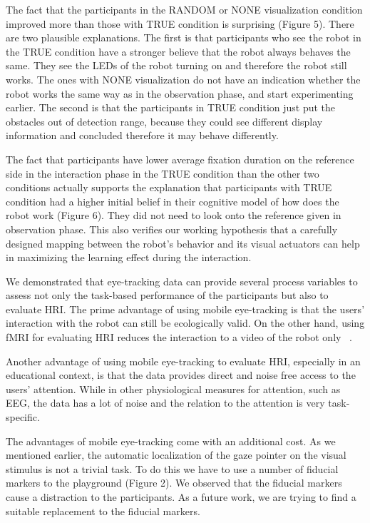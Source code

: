 \documentclass{sig-alternate}
\begin{document}
The fact that the participants in the RANDOM or NONE visualization
condition improved more than those with TRUE condition is surprising
(Figure 5). There are two plausible explanations. The first is that
participants who see the robot in the TRUE condition have a stronger
believe that the robot always behaves the same. They see the LEDs of the
robot turning on and therefore the robot still works. The ones with NONE
visualization do not have an indication whether the robot works the same
way as in the observation phase, and start experimenting earlier. The
second is that the participants in TRUE condition just put the obstacles
out of detection range, because they could see different display
information and concluded therefore it may behave differently.

The fact that participants have lower average fixation duration on the
reference side in the interaction phase in the TRUE condition than the
other two conditions actually supports the explanation that participants
with TRUE condition had a higher initial belief in their cognitive model
of how does the robot work (Figure 6). They did not need to look onto
the reference given in observation phase. This also verifies our working
hypothesis that a carefully designed mapping between the robot's
behavior and its visual actuators can help in maximizing the learning
effect during the interaction.

We demonstrated that eye-tracking data can provide several process
variables to assess not only the task-based performance of the
participants but also to evaluate HRI. The prime advantage of using
mobile eye-tracking is that the users' interaction with the robot can
still be ecologically valid. On the other hand, using fMRI for
evaluating HRI reduces the interaction to a video of the robot only
~\cite{rosenthal2013neural}.

Another advantage of using mobile eye-tracking to evaluate HRI,
especially in an educational context, is that the data provides direct
and noise free access to the users' attention. While in other
physiological measures for attention, such as EEG, the data has a lot of
noise and the relation to the attention is very task-specific.

The advantages of mobile eye-tracking come with an additional cost. As
we mentioned earlier, the automatic localization of the gaze pointer on
the visual stimulus is not a trivial task. To do this we have to use a
number of fiducial markers to the playground (Figure 2). We observed
that the fiducial markers cause a distraction to the participants. As a
future work, we are trying to find a suitable replacement to the
fiducial markers.
\end{document}
